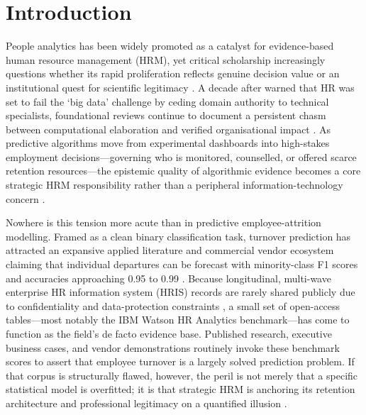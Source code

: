 \documentclass[12pt,a4paper]{article}
\begin{document}
\section{Introduction}
People analytics has been widely promoted as a catalyst for evidence-based human resource management (HRM), yet critical scholarship increasingly questions whether its rapid proliferation reflects genuine decision value or an institutional quest for scientific legitimacy \parencite{ref50,ref44,ref51,ref56}. A decade after \textcite{ref50} warned that HR was set to fail the `big data' challenge by ceding domain authority to technical specialists, foundational reviews continue to document a persistent chasm between computational elaboration and verified organisational impact \parencite{ref44,ref57,ref52}. As predictive algorithms move from experimental dashboards into high-stakes employment decisions---governing who is monitored, counselled, or offered scarce retention resources---the epistemic quality of algorithmic evidence becomes a core strategic HRM responsibility rather than a peripheral information-technology concern \parencite{ref45,ref54,ref58,ref53}.

Nowhere is this tension more acute than in predictive employee-attrition modelling. Framed as a clean binary classification task, turnover prediction has attracted an expansive applied literature and commercial vendor ecosystem claiming that individual departures can be forecast with minority-class F1 scores and accuracies approaching 0.95 to 0.99 \parencite{ref1,ref2,ref3,ref23,ref24}. Because longitudinal, multi-wave enterprise HR information system (HRIS) records are rarely shared publicly due to confidentiality and data-protection constraints \parencite{ref52,ref64}, a small set of open-access tables---most notably the IBM Watson HR Analytics benchmark---has come to function as the field's de facto evidence base. Published research, executive business cases, and vendor demonstrations routinely invoke these benchmark scores to assert that employee turnover is a largely solved prediction problem. If that corpus is structurally flawed, however, the peril is not merely that a specific statistical model is overfitted; it is that strategic HRM is anchoring its retention architecture and professional legitimacy on a quantified illusion \parencite{ref51,ref60}.
\end{document}
